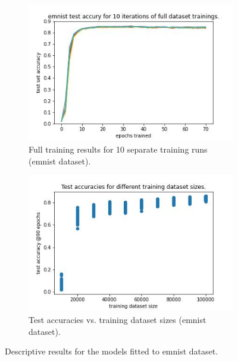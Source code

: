 \documentclass{article} %
\begin{document}
\begin{figure}
    \begin{subfigure}{.5\textwidth}
        \centering
        \includegraphics[width=.8\linewidth]{emnist/full_dataset_acc_vs_epoch.jpg}
        \caption{Full training results for 10 separate training runs (emnist dataset).}
        \label{fig_full_dataset_epoch_vs_acc}
    \end{subfigure}%
    \begin{subfigure}{.5\textwidth}
        \centering
        \includegraphics[width=.8\linewidth]{emnist/training_datasetsize_vs_test_acc.jpg}
        \caption{Test accuracies vs. training dataset sizes (emnist dataset).}
        \label{fig_traing_subset_size_vs_test_acc}
    \end{subfigure}

    \caption{Descriptive results for the models fitted to emnist dataset.}
    \label{fig:desc_plots_emnist}
\end{figure}
\end{document}
